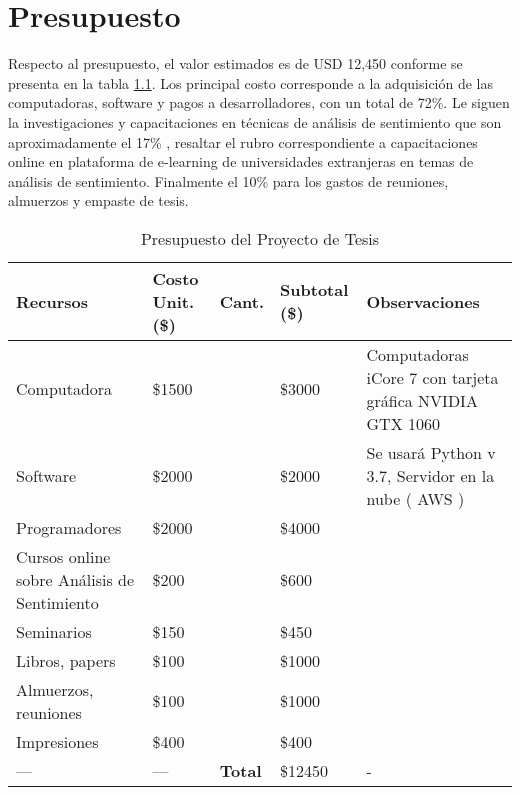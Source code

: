 %
\chapter{Presupuesto}

Respecto al presupuesto, el valor estimados es de USD 12,450 conforme se presenta en la tabla \ref{budget_tbl}. Los principal costo corresponde a la adquisici\'on de las computadoras, software y pagos a desarrolladores, con un total de 72\%. Le siguen la investigaciones y capacitaciones en t\'ecnicas de an\'alisis de sentimiento que son aproximadamente el 17\% , resaltar el rubro correspondiente a capacitaciones online en plataforma de e-learning de universidades extranjeras en temas de an\'alisis de sentimiento.  Finalmente el 10\% para los gastos de reuniones, almuerzos y empaste de tesis.


\begin{table}[h!]

\begin{tabular}{ |p{4.25cm}|p{1.5cm}|p{1cm}|p{1.5cm}|p{5cm}| }
\hline
\rowcolor{gray!40}  \textbf{Recursos}         & \textbf{Costo Unit.(\$)}      & \textbf{Cant.} & \textbf{Subtotal (\$)} & \textbf{Observaciones}   \\  \hline
 Computadora                        & \raggedleft \$1500  &\centering 2  &\raggedleft \$3000  &  Computadoras iCore 7 con tarjeta gr\'afica NVIDIA GTX 1060    \\   \hline
 Software                        & \raggedleft \$2000  &\centering 1  &\raggedleft \$2000  &  Se usar\'a Python v 3.7, Servidor en la nube ( AWS )    \\   \hline
 Programadores              & \raggedleft \$2000    & \centering 2  &\raggedleft \$4000   & \\   \hline
 Cursos online sobre An\'alisis de Sentimiento              &\raggedleft  \$200    &\centering 3  &\raggedleft  \$600   & \\   \hline
 Seminarios              & \raggedleft \$150    & \centering 3  &\raggedleft \$450   & \\   \hline
 Libros, papers              & \raggedleft \$100    & \centering 10  &\raggedleft \$1000   & \\   \hline
 Almuerzos, reuniones              & \raggedleft \$100    & \centering 10  &\raggedleft \$1000   & \\   \hline
Impresiones              & \raggedleft \$400    & \centering 1  &\raggedleft \$400   & \\   \hline
 \centering          ---           &   \centering   --- & \cellcolor{gray!40} \textbf{Total}   &\raggedleft \$12450   &  -  \\   \hline
\end{tabular}
\caption{Presupuesto del Proyecto de Tesis}
\label{budget_tbl}
\end{table}



\cleardoublepage